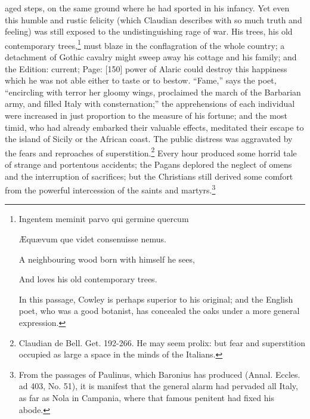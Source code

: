 aged steps, on the same ground where he had sported in his infancy. Yet even this humble and rustic felicity (which Claudian describes with so much truth and feeling) was still exposed to the undistinguishing rage of war. His trees, his old contemporary trees,\footnote{Ingentem meminit parvo qui germine quercum

Æquævum que videt consenuisse nemus.

A neighbouring wood born with himself he sees,

And loves his old contemporary trees.

In this passage, Cowley is perhaps superior to his original; and the English poet, who was a good botanist, has concealed the oaks under a more general expression.} must blaze in the conflagration of the whole country; a detachment of Gothic cavalry might sweep away his cottage and his family; and the Edition: current; Page: [150] power of Alaric could destroy this happiness which he was not able either to taste or to bestow. \texthebrew{“}Fame,\texthebrew{}” says the poet, \texthebrew{“}encircling with terror her gloomy wings, proclaimed the march of the Barbarian army, and filled Italy with consternation;\texthebrew{}” the apprehensions of each individual were increased in just proportion to the measure of his fortune; and the most timid, who had already embarked their valuable effects, meditated their escape to the island of Sicily or the African coast. The public distress was aggravated by the fears and reproaches of superstition.\footnote{Claudian de Bell. Get. 192-266. He may seem prolix: but fear and superstition occupied as large a space in the minds of the Italians.} Every hour produced some horrid tale of strange and portentous accidents; the Pagans deplored the neglect of omens and the interruption of sacrifices; but the Christians still derived some comfort from the powerful intercession of the saints and martyrs.\footnote{From the passages of Paulinus, which Baronius has produced (Annal. Eccles. ad 403, No. 51), it is manifest that the general alarm had pervaded all Italy, as far as Nola in Campania, where that famous penitent had fixed his abode.}

